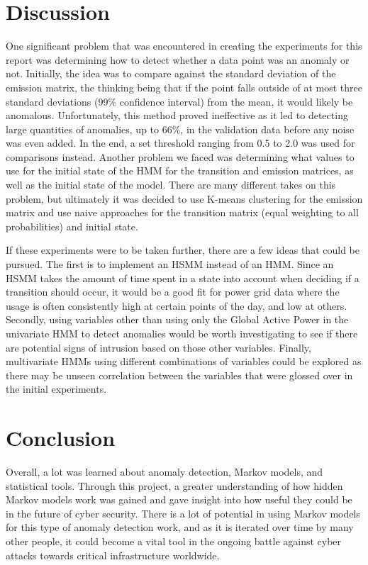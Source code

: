 \documentclass[letterpaper, 11pt]{article}%
\begin{document}
\section{Discussion}
One significant problem that was encountered in creating the experiments for this report was determining how to detect whether a data point was an anomaly or not. Initially, the idea was to compare against the standard deviation of the emission matrix, the thinking being that if the point falls outside of at most three standard deviations (99\% confidence interval) from the mean, it would likely be anomalous. Unfortunately, this method proved ineffective as it led to detecting large quantities of anomalies, up to 66\%, in the validation data before any noise was even added. In the end, a set threshold ranging from 0.5 to 2.0 was used for comparisons instead. Another problem we faced was determining what values to use for the initial state of the HMM for the transition and emission matrices, as well as the initial state of the model. There are many different takes on this problem, but ultimately it was decided to use K-means clustering for the emission matrix and use naive approaches for the transition matrix (equal weighting to all probabilities) and initial state.
	
If these experiments were to be taken further, there are a few ideas that could be pursued. The first is to implement an HSMM instead of an HMM. Since an HSMM takes the amount of time spent in a state into account when deciding if a transition should occur, it would be a good fit for power grid data where the usage is often consistently high at certain points of the day, and low at others. Secondly, using variables other than using only the Global Active Power in the univariate HMM to detect anomalies would be worth investigating to see if there are potential signs of intrusion based on those other variables. Finally, multivariate HMMs using different combinations of variables could be explored as there may be unseen correlation between the variables that were glossed over in the initial experiments.

\section{Conclusion}
Overall, a lot was learned about anomaly detection, Markov models, and statistical tools. Through this project, a greater understanding of how hidden Markov models work was gained and gave insight into how useful they could be in the future of cyber security. There is a lot of potential in using Markov models for this type of anomaly detection work, and as it is iterated over time by many other people, it could become a vital tool in the ongoing battle against cyber attacks towards critical infrastructure worldwide.
\end{document}
